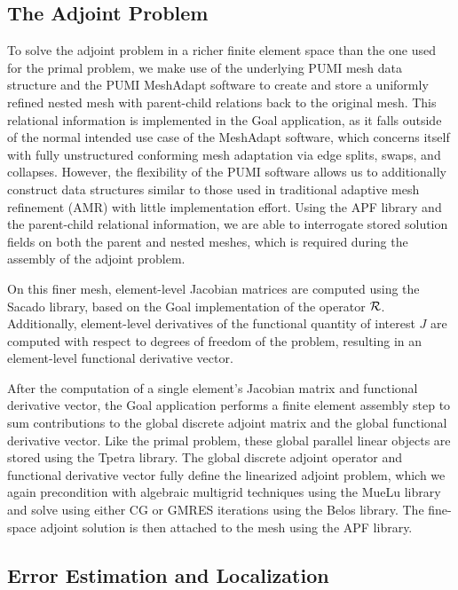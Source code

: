 \subsection{The Adjoint Problem}

To solve the adjoint problem in a richer finite element space than the one
used for the primal problem, we make use of the underlying PUMI mesh data
structure \cite{ibanez2017modifiable} and the PUMI MeshAdapt software to
create and store a uniformly refined nested mesh with parent-child relations
back to the original mesh. This relational information is implemented in the
Goal application, as it falls outside of the normal intended use case of the
MeshAdapt software, which concerns itself with fully unstructured conforming
mesh adaptation via edge splits, swaps, and collapses. However,
the flexibility of the PUMI software allows us to
additionally construct data structures similar to those used in traditional
adaptive mesh refinement (AMR) with little implementation effort. Using
the APF library and the parent-child relational information, we are able
to interrogate stored solution fields on both the parent and nested meshes,
which is required during the assembly of the adjoint problem.

On this finer mesh, element-level Jacobian matrices are computed using the
Sacado library, based on the Goal implementation of the operator $\mathcal{R}$.
Additionally, element-level derivatives of the functional quantity of
interest $J$ are computed with respect to degrees of freedom of the problem,
resulting in an element-level functional derivative vector.

After the computation of a single element's Jacobian matrix and functional
derivative vector, the Goal application performs a finite element assembly
step to sum contributions to the global discrete adjoint matrix and the
global functional derivative vector. Like the primal problem, these global
parallel linear objects are stored using the Tpetra library. The global
discrete adjoint operator and functional derivative vector fully define the
linearized adjoint problem, which we again precondition with algebraic
multigrid techniques using the MueLu library and solve using either CG
or GMRES iterations using the Belos library. The fine-space adjoint solution
is then attached to the mesh using the APF library.

\subsection{Error Estimation and Localization}

